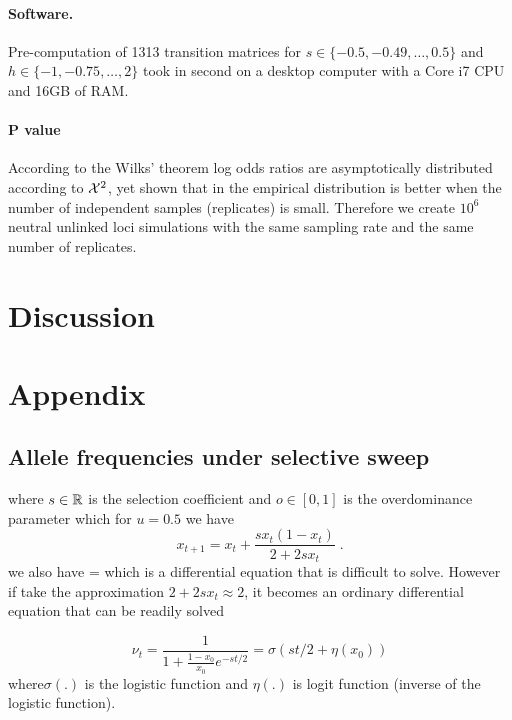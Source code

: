 \documentclass[11pt]{article}
\begin{document}
\paragraph{Software.}
Pre-computation of 1313 transition matrices for $s\in\{-0.5,-0.49,\ldots,0.5 \}$ and $h\in \{-1,-0.75,\ldots,2\}$ took in second on a desktop computer with a Core i7 CPU and 16GB of RAM.


\paragraph{P value}
According to the Wilks’ theorem \cite{}  log odds ratios are asymptotically distributed according to ${\cal X}^2$, yet \cite{feder2014Identifying} shown that in the empirical distribution is better when the number of independent samples (replicates) is small. Therefore we create $10^6$ neutral unlinked loci simulations with the same sampling rate and the same number of replicates.







\section{Discussion}


\section{Appendix}
\subsection{Allele frequencies under selective sweep} \label{app:af}

\beq
\eeq
where $s\in {\mathbb R}$ is the selection coefficient and $o\in[0,1]$ is the 
overdominance parameter which for $u=0.5$ we have
\begin{equation}
x_{t+1}=x_t+\frac{sx_t(1-x_t)}{2+2sx_t}\;.
\label{eq:transition}
\end{equation}
we also have
\beq
{} = 
\eeq
which is a differential equation that is difficult to solve. However if take 
the approximation $2+2sx_t \approx 2$, it becomes an ordinary differential 
equation that can be readily solved

\begin{equation}
\nu_t =\frac{1}{1+\frac{1-x_0}{x_0}e^{-st/2}} = \sigma(st/2+\eta(x_0)) 
\label{eq:inf-pop}
\end{equation}
where$\sigma(.)$ is the logistic
function and $\eta(.)$ is logit function (inverse of the logistic function). 
\end{document}

